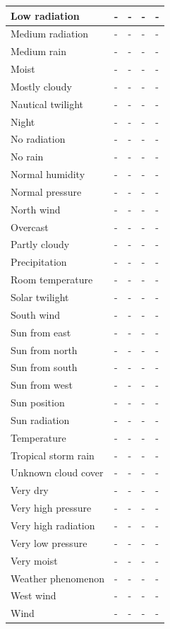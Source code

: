 \begin{longtable}{|p{}|p{}|p{}|p{}|p{}|}
  \hline
  Low radiation & - & - & - & - \\
  \hline
  Medium radiation & - & - & - & - \\
  \hline
  Medium rain & - & - & - & - \\
  \hline
  Moist & - & - & - & - \\
  \hline
  Mostly cloudy & - & - & - & - \\
  \hline
  Nautical twilight & - & - & - & - \\
  \hline
  Night & - & - & - & - \\
  \hline
  No radiation & - & - & - & - \\
  \hline
  No rain & - & - & - & - \\
  \hline
  Normal humidity & - & - & - & - \\
  \hline
  Normal pressure & - & - & - & - \\
  \hline
  North wind & - & - & - & - \\
  \hline
  Overcast & - & - & - & - \\
  \hline
  Partly cloudy & - & - & - & - \\
  \hline
  Precipitation & - & - & - & - \\
  \hline
  Room temperature & - & - & - & - \\
  \hline
  Solar twilight & - & - & - & - \\
  \hline
  South wind & - & - & - & - \\
  \hline
  Sun from east & - & - & - & - \\
  \hline
  Sun from north & - & - & - & - \\
  \hline
  Sun from south & - & - & - & - \\
  \hline
  Sun from west & - & - & - & - \\
  \hline
  Sun position & - & - & - & - \\
  \hline
  Sun radiation & - & - & - & - \\
  \hline
  Temperature & - & - & - & - \\
  \hline
  Tropical storm rain & - & - & - & - \\
  \hline
  Unknown cloud cover & - & - & - & - \\
  \hline
  Very dry & - & - & - & - \\
  \hline
  Very high pressure & - & - & - & - \\
  \hline
  Very high radiation & - & - & - & - \\
  \hline
  Very low pressure & - & - & - & - \\
  \hline
  Very moist & - & - & - & - \\
  \hline
  Weather phenomenon & - & - & - & - \\
  \hline
  West wind & - & - & - & - \\
  \hline
  Wind & - & - & - & - \\
  \hline
\end{longtable}

